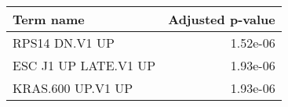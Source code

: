 \begin{tabular}{lr}
\toprule
           Term name &  Adjusted p-value \\
\midrule
      RPS14 DN.V1 UP &          1.52e-06 \\
ESC J1 UP LATE.V1 UP &          1.93e-06 \\
   KRAS.600 UP.V1 UP &          1.93e-06 \\
\bottomrule
\end{tabular}
